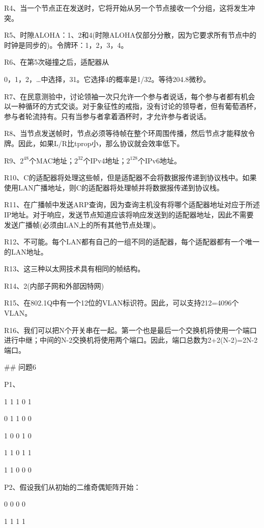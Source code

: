 \documentclass[11pt,UTF8,twoside]{article}
\begin{document}
	R4、当一个节点正在发送时，它将开始从另一个节点接收一个分组，这将发生冲突。
	
	R5、时隙ALOHA：1、2和4(时隙ALOHA仅部分分散，因为它要求所有节点中的时钟是同步的)。令牌环：1，2，3，4。
	
	R6、在第5次碰撞之后，适配器从{0，1，2，…中选择，31。它选择4的概率是1/32。等待204.8微秒。
		
		R7、在民意测验中，讨论领袖一次只允许一个参与者说话，每个参与者都有机会以一种循环的方式交谈。对于象征性的戒指，没有讨论的领导者，但有葡萄酒杯，参与者轮流持有。只有当参与者拿着酒杯时，才允许参与者说话。
		
		R8、当节点发送帧时，节点必须等待帧在整个环周围传播，然后节点才能释放令牌。因此，如果L/R比tprop小，那么协议就会效率低下。
		
		R9、$2^{48}$个MAC地址；$2^{32}$个IPv4地址；$2^{128}$个IPv6地址。
		
		R10、C的适配器将处理这些帧，但是适配器不会将数据报传递到协议栈中。如果使用LAN广播地址，则C的适配器将处理帧并将数据报传递到协议栈。
		
		R11、在广播帧中发送ARP查询，因为查询主机没有将哪个适配器地址对应于所述IP地址。对于响应，发送节点知道应该将响应发送到的适配器地址，因此不需要发送广播帧(必须由LAN上的所有其他节点处理)。
		
		R12、不可能。每个LAN都有自己的一组不同的适配器，每个适配器都有一个唯一的LAN地址。
		
		R13、这三种以太网技术具有相同的帧结构。
		
		R14、2(内部子网和外部因特网)
		
		R15、在802.1Q中有一个12位的VLAN标识符。因此，可以支持212=4096个VLAN。
		
		R16、我们可以把N个开关串在一起。第一个也是最后一个交换机将使用一个端口进行中继；中间的N-2交换机将使用两个端口。因此，端口总数为2+2(N-2)=2N-2端口。
		
			\newpage
		\pagestyle{fancy}
		\fancyhf{}  %
		\pagestyle{fancy}
		
		## 问题6 
		
		P1、
		
		1 1 1 0 1 
		
		0 1 1 0 0 
		
		1 0 0 1 0 
		
		1 1 0 1 1 
		
		1 1 0 0 0 
		
		P2、假设我们从初始的二维奇偶矩阵开始：
		
		0 0 0 0 
		
		1 1 1 1 
		
}
\end{document}
